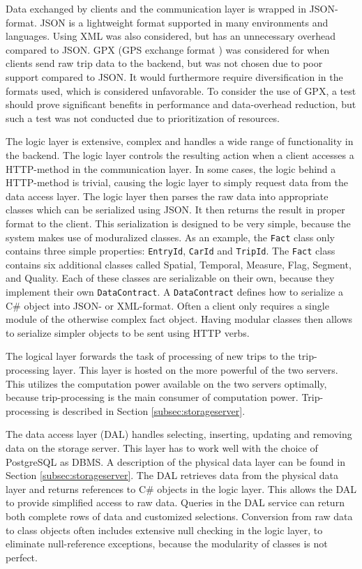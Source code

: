 Data exchanged by clients and the communication layer is wrapped in JSON-format. JSON is a lightweight format supported in many environments and languages. Using XML was also considered, but has an unnecessary overhead compared to JSON. GPX (GPS exchange format \citep{GPX_format}) was considered for when clients send raw trip data to the backend, but was not chosen due to poor support compared to JSON. It would furthermore require diversification in the formats used, which is considered unfavorable. To consider the use of GPX, a test should prove significant benefits in performance and data-overhead reduction, but such a test was not conducted due to prioritization of resources. 

The logic layer is extensive, complex and handles a wide range of functionality in the backend. The logic layer controls the resulting action when a client accesses a HTTP-method in the communication layer. In some cases, the logic behind a HTTP-method is trivial, causing the logic layer to simply request data from the data access layer. The logic layer then parses the raw data into appropriate classes which can be serialized using JSON. It then returns the result in proper format to the client. This serialization is designed to be very simple, because the system makes use of moduralized classes. As an example, the \texttt{Fact} class only contains three simple properties: \texttt{EntryId}, \texttt{CarId} and \texttt{TripId}. The \texttt{Fact} class contains six additional classes called Spatial, Temporal, Measure, Flag, Segment, and Quality. Each of these classes are serializable on their own, because they implement their own \texttt{DataContract}. A \texttt{DataContract} defines how to serialize a C\# object into JSON- or XML-format. Often a client only requires a single module of the otherwise complex fact object. Having modular classes then allows to serialize simpler objects to be sent using HTTP verbs.

The logical layer forwards the task of processing of new trips to the trip-processing layer. This layer is hosted on the more powerful of the two servers. This utilizes the computation power available on the two servers optimally, because trip-processing is the main consumer of computation power. Trip-processing is described in Section \ref{subsec:storageserver}. 

The data access layer (DAL) handles selecting, inserting, updating and removing data on the storage server. This layer has to work well with the choice of PostgreSQL as DBMS. A description of the physical data layer can be found in Section \ref{subsec:storageserver}. The DAL retrieves data from the physical data layer and returns references to C\# objects in the logic layer. This allows the DAL to provide simplified access to raw data. Queries in the DAL service can return both complete rows of data and customized selections. Conversion from raw data to class objects often includes extensive null checking in the logic layer, to eliminate null-reference exceptions, because the modularity of classes is not perfect. 